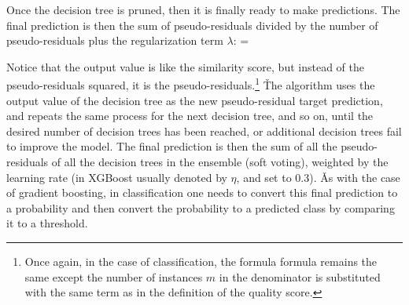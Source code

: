 Once the decision tree is pruned, then it is finally ready to make predictions. The final prediction is then the
sum of pseudo-residuals divided by the number of pseudo-residuals plus the regularization term $\lambda$:
\bse
{} = 
\ese

Notice that the output value is like the similarity score, but instead of the pseudo-residuals squared, it is the
pseudo-residuals.\footnote{Once again, in the case of classification, the formula formula remains the same except the
number of instances $m$ in the denominator is substituted with the same term as in the definition of the quality score.}
\v

The algorithm uses the output value of the decision tree as the new pseudo-residual target prediction, and repeats
the same process for the next decision tree, and so on, until the desired number of decision trees has been reached,
or additional decision trees fail to improve the model. The final prediction is then the sum of all the
pseudo-residuals of all the decision trees in the ensemble (soft voting), weighted by the learning rate (in XGBoost
usually denoted by $\eta$, and set to 0.3). \v

As with the case of gradient boosting, in classification one needs to convert this final prediction to a probability
and then convert the probability to a predicted class by comparing it to a threshold.